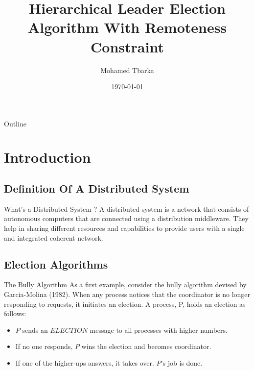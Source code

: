 \documentclass{beamer}
\title{Hierarchical Leader Election Algorithm With Remoteness Constraint}
\author{Mohamed Tbarka}
\date{\today}
\begin{document}

\frame{\titlepage}

\section[Outline]{}
\begin{frame}{Outline}

  \tableofcontents
\end{frame}

\section{Introduction}
\subsection{Definition Of A Distributed System}
\begin{frame}{What's a Distributed System ?}
	A distributed system is a network that consists of autonomous computers that are connected using a distribution middleware. They help in sharing different resources and capabilities to provide users with a single and integrated coherent network.
\end{frame}
\subsection{Election Algorithms}
\begin{frame}{The Bully Algorithm}
  As a first example, consider the bully algorithm devised by Garcia-Molina (1982). When any process notices that the coordinator is no longer responding to requests, it initiates an election. A process, P, holds an election as follows:
  \pause
  \begin{itemize}
    \item <2-> $P$ sends an $ELECTION$ message to all processes with higher numbers.
    \item <3-> If no one responds, $P$ wins the election and becomes coordinator.
    \item <4-> If one of the higher-ups answers, it takes over. $P$'s job is done.
  \end{itemize}
\end{frame}
\end{document}
